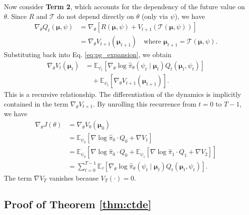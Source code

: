 \documentclass{article}
\begin{document}
Now consider \textbf{Term 2}, which accounts for the dependency of the future value on $\theta$. Since $R$ and $\mathcal{T}$ do not depend directly on $\theta$ (only via $\psi$), we have
\begin{align}
    \nabla_\theta Q_t(\boldsymbol{\mu}, \psi) &= \nabla_\theta \left[ R(\boldsymbol{\mu}, \psi) + V_{t+1}(\mathcal{T}(\boldsymbol{\mu}, \psi)) \right] \nonumber \\
    &= \nabla_\theta V_{t+1}(\boldsymbol{\mu}_{t+1}) \quad \text{where } \boldsymbol{\mu}_{t+1} = \mathcal{T}(\boldsymbol{\mu}, \psi).
\end{align}
Substituting back into Eq. \eqref{eq:pg_expansion}, we obtain
\begin{align}
    \nabla_\theta V_t(\boldsymbol{\mu}_t) &= \mathbb{E}_{\psi_t} \left[ \nabla_\theta \log \hat{\pi}_\theta(\psi_t \mid \boldsymbol{\mu}_t) Q_t(\boldsymbol{\mu}_t, \psi_t) \right] \nonumber \\
    &\quad + \mathbb{E}_{\psi_t} \left[ \nabla_\theta V_{t+1}(\boldsymbol{\mu}_{t+1}) \right].
\end{align}
This is a recursive relationship. The differentiation of the dynamics is implicitly contained in the term $\nabla_\theta V_{t+1}$. By unrolling this recurrence from $t=0$ to $T-1$, we have
\begin{align}
    \nabla_\theta J(\theta) &= \nabla_\theta V_0(\boldsymbol{\mu}_0) \nonumber \\
    &= \mathbb{E}_{\psi_0} [ \nabla \log \hat{\pi}_0 \cdot Q_0 + \nabla V_1 ] \nonumber \\
    &= \mathbb{E}_{\psi_0} [ \nabla \log \hat{\pi}_0 \cdot Q_0 + \mathbb{E}_{\psi_1} [ \nabla \log \hat{\pi}_1 \cdot Q_1 + \nabla V_2 ] ] \nonumber \\
    &= \sum_{t=0}^{T-1} \mathbb{E}_{\tau} \left[ \nabla_\theta \log \hat{\pi}_\theta(\psi_t \mid \boldsymbol{\mu}_t) Q_t(\boldsymbol{\mu}_t, \psi_t) \right].
\end{align}
The term $\nabla V_T$ vanishes because $V_T(\cdot) = 0$.

\subsection{Proof of Theorem \ref{thm:ctde}}
\label{app:ctde}
\end{document}
